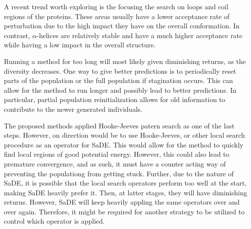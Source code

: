 A recent trend worth exploring is the focusing the search on loops and coil
regions of the proteins. These areas usually have a lower acceptance rate of
perturbation due to the high impact they have on the overall conformation.  In
contrast, $\alpha$-helices are relatively stable and have a much higher
acceptance rate while having a low impact in the overall structure.

Running a method for too long will most likely given diminishing returns, as
the diversity decreases. One way to give better predictions is to periodically
reset parts of the population or the full population if stagination occurs. This
can allow for the method to run longer and possibly lead to better predictions.
In particular, partial population reinitialization allows for old information
to contribute to the newer generated individuals.

The proposed methods applied Hooke-Jeeves patern search as one of the last steps.
However, on direction would be to use Hooke-Jeeves, or other local search
procedure as an operator for SaDE. This would allow for the method to quickly
find local regions of good potential energy. However, this could also lead to
premature convergence, and as such, it must have a counter acting way of
preventing the populationg from getting stuck. Further, due to the nature of
SaDE, it is possible that the local search operators perform too well at the
start, making SaDE heavily prefer it. Then, at latter stages, they will
have diminishing returns. However, SaDE will keep heavily appling the
same operators over and over again. Therefore, it might be required for another
strategy to be utilized to control which operator is applied.
